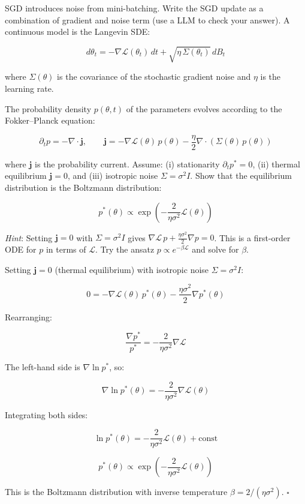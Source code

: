 \documentclass[11pt]{article}
\begin{document}
SGD introduces noise from mini-batching. Write the SGD update as a combination of gradient and noise term (use a LLM to check your answer). A continuous model is the
Langevin SDE:

\[d\theta_t = -\nabla \mathcal{L}(\theta_t)\,dt + \sqrt{\eta\,\Sigma(\theta_t)}\,dB_t\]

where \(\Sigma(\theta)\) is the covariance of the stochastic gradient
noise and \(\eta\) is the learning rate.

\begin{exercise}
\label{ex:td-6a}
The probability density \(p(\theta, t)\) of the parameters
evolves according to the Fokker--Planck equation:

\[\partial_t p = -\nabla \cdot \mathbf{j}, \qquad \mathbf{j} = -\nabla \mathcal{L}(\theta)\,p(\theta) - \frac{\eta}{2}\nabla \cdot \left(\Sigma(\theta)\,p(\theta)\right)\]

where \(\mathbf{j}\) is the probability current. Assume: (i)
stationarity \(\partial_t p^* = 0\), (ii) thermal equilibrium
\(\mathbf{j} = 0\), and (iii) isotropic noise \(\Sigma = \sigma^2 I\).
Show that the equilibrium distribution is the Boltzmann distribution:

\[p^*(\theta) \propto \exp\left(-\frac{2}{\eta \sigma^2}\mathcal{L}(\theta)\right)\]

\emph{Hint}: Setting \(\mathbf{j} = 0\) with \(\Sigma = \sigma^2 I\)
gives \(\nabla \mathcal{L}\, p + \frac{\eta\sigma^2}{2}\nabla p = 0\).
This is a first-order ODE for \(p\) in terms of \(\mathcal{L}\). Try the
ansatz \(p \propto e^{-\beta \mathcal{L}}\) and solve for \(\beta\).
\end{exercise}

\begin{solution}[ex:td-6a]
Setting \(\mathbf{j} = 0\) (thermal equilibrium) with
isotropic noise \(\Sigma = \sigma^2 I\):

\[0 = -\nabla\mathcal{L}(\theta)\,p^*(\theta) - \frac{\eta\sigma^2}{2}\nabla p^*(\theta)\]

Rearranging:

\[\frac{\nabla p^*}{p^*} = -\frac{2}{\eta\sigma^2}\nabla\mathcal{L}\]

The left-hand side is \(\nabla\ln p^*\), so:

\[\nabla\ln p^*(\theta) = -\frac{2}{\eta\sigma^2}\nabla\mathcal{L}(\theta)\]

Integrating both sides:

\[\ln p^*(\theta) = -\frac{2}{\eta\sigma^2}\mathcal{L}(\theta) + \text{const}\]

\[\boxed{p^*(\theta) \propto \exp\!\left(-\frac{2}{\eta\sigma^2}\mathcal{L}(\theta)\right)}\]

This is the Boltzmann distribution with inverse temperature
\(\beta = 2/(\eta\sigma^2)\). \(\square\)
\end{solution}
\end{document}
